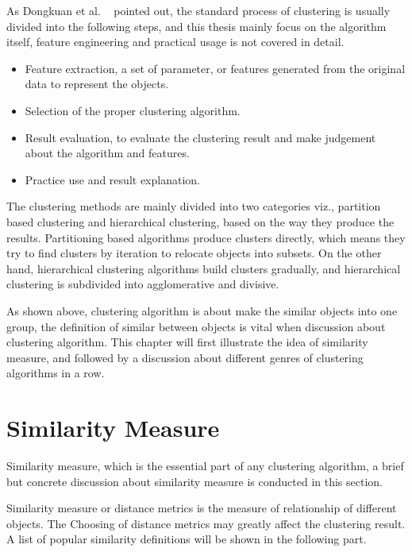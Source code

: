\documentclass[utf8,english]{gradu3}
\begin{document}
As Dongkuan et al. ~\cite{xu2015comprehensive} pointed out, the standard process of clustering is usually divided into the following steps, and this thesis mainly focus on the algorithm itself, feature engineering and practical usage is not covered in detail.

\begin{itemize}
	\item Feature extraction, a set of parameter, or features generated from the original data to represent the objects.
	\item Selection of the proper clustering algorithm.
	\item Result evaluation, to evaluate the clustering result and make judgement about the algorithm and features.
	\item Practice use and result explanation.
\end{itemize}

The clustering methods are mainly divided into two categories viz., partition based clustering and hierarchical clustering, based on the way they produce the results. Partitioning based algorithms produce clusters directly, which means they try to find clusters by iteration to relocate objects into subsets. On the other hand, hierarchical clustering algorithms build clusters gradually, and hierarchical clustering is subdivided into agglomerative and divisive.

As shown above, clustering algorithm is about make the similar objects into one group, the definition of similar between objects is vital when discussion about clustering algorithm. This chapter will first illustrate the idea of similarity measure, and followed by a discussion about different genres of clustering algorithms in a row.

\section{Similarity Measure}

Similarity measure, which is the essential part of any clustering algorithm, a brief but concrete discussion about similarity measure is conducted in this section.

Similarity measure or distance metrics is the measure of relationship of different objects. 
The Choosing of distance metrics may greatly affect the clustering result. A list of popular similarity definitions will be shown in the following part.
\end{document}
